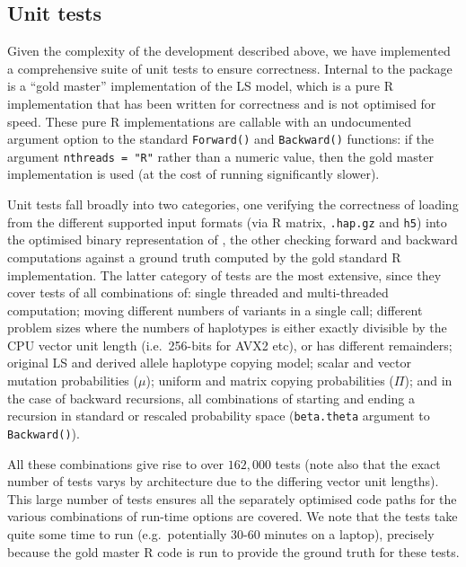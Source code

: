 \documentclass[pdflatex,referee,lineno,sn-nature]{sn-jnl}%
\let\proglang=\textsf
\begin{document}
\subsection*{Unit tests}

Given the complexity of the development described above, we have implemented a comprehensive suite of unit tests to ensure correctness.
Internal to the package is a ``gold master'' implementation of the LS model, which is a pure \proglang{R} implementation that has been written for correctness and is not optimised for speed.
These pure \proglang{R} implementations are callable with an undocumented argument option to the standard \texttt{Forward()} and \texttt{Backward()} functions: if the argument \texttt{nthreads = "R"} rather than a numeric value, then the gold master implementation is used (at the cost of running significantly slower).

Unit tests fall broadly into two categories, one verifying the correctness of loading from the different supported input formats (via R matrix, \texttt{.hap.gz} and \texttt{h5}) into the optimised binary representation of , the other checking forward and backward computations against a ground truth computed by the gold standard \proglang{R} implementation.
The latter category of tests are the most extensive, since they cover tests of all combinations of: single threaded and multi-threaded computation; moving different numbers of variants in a single call; different problem sizes where the numbers of haplotypes is either exactly divisible by the CPU vector unit length (i.e.~256-bits for AVX2 etc), or has different remainders; original LS and derived allele haplotype copying model; scalar and vector mutation probabilities (\(\mu\)); uniform and matrix copying probabilities (\(\Pi\)); and in the case of backward recursions, all combinations of starting and ending a recursion in standard or rescaled probability space (\texttt{beta.theta} argument to \texttt{Backward()}).

All these combinations give rise to over $162,000$ tests (note also that the exact number of tests varys by architecture due to the differing vector unit lengths).
This large number of tests ensures all the separately optimised code paths for the various combinations of run-time options are covered.
We note that the tests take quite some time to run (e.g.~potentially 30-60 minutes on a laptop), precisely because the gold master \proglang{R} code is run to provide the ground truth for these tests.
\end{document}
